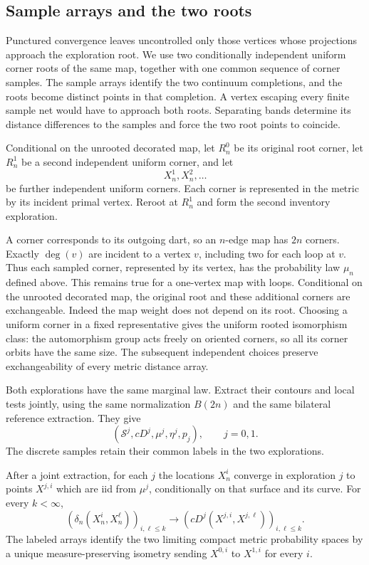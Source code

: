 \subsection{Sample arrays and the two roots}

Punctured convergence leaves uncontrolled only those vertices whose
projections approach the exploration root. We use two conditionally
independent uniform corner roots of the same map, together with one
common sequence of corner samples. The sample arrays identify the two
continuum completions, and the roots become distinct points in that
completion. A vertex escaping every finite sample net would have to
approach both roots. Separating bands determine its distance differences
to the samples and force the two root points to coincide.

Conditional on the unrooted decorated map, let \(R_n^0\) be its
original root corner, let \(R_n^1\) be a second independent
uniform corner, and let
\[
                     X_n^1,X_n^2,\ldots
\]
be further independent uniform corners.  Each corner is
represented in the metric by its incident primal vertex.
Reroot at \(R_n^1\) and form the second inventory exploration.

A corner corresponds to its outgoing dart, so an \(n\)-edge map has
\(2n\) corners. Exactly \(\deg(v)\) are incident to a vertex \(v\),
including two for each loop at \(v\). Thus each sampled corner,
represented by its vertex, has the probability law \(\mu_n\) defined
above. This remains true for a one-vertex map with loops.
Conditional on the unrooted decorated map,
the original root and these additional corners are
exchangeable.  Indeed the map weight does not depend on its
root.  Choosing a uniform corner in a fixed representative
gives the uniform rooted isomorphism class: the automorphism
group acts freely on oriented corners, so all its corner
orbits have the same size.  The subsequent independent
choices preserve exchangeability of every metric distance
array.

Both explorations have the same marginal law.  Extract their
contours and local tests jointly, using the same normalization
\(B(2n)\) and the same bilateral reference extraction.  They
give
\[
 (\mathcal S^j,cD^j,\mu^j,\eta^j,p_j),\qquad j=0,1.
\]
The discrete samples retain their common labels in the two
explorations.

\begin{lemma}
\label{finite:sample-array}
After a joint extraction, for each \(j\) the locations
\(X_n^i\) converge in exploration \(j\) to points \(X^{j,i}\)
which are iid from \(\mu^j\), conditionally on that surface and
its curve.  For every \(k<\infty\),
\[
 \left(\delta_n(X_n^i,X_n^\ell)\right)_{i,\ell\le k}
 \longrightarrow
 \left(cD^j(X^{j,i},X^{j,\ell})\right)_{i,\ell\le k}.
\]
The labeled arrays identify the two limiting compact metric
probability spaces by a unique measure-preserving isometry sending
\(X^{0,i}\) to \(X^{1,i}\) for every \(i\).
\end{lemma}

